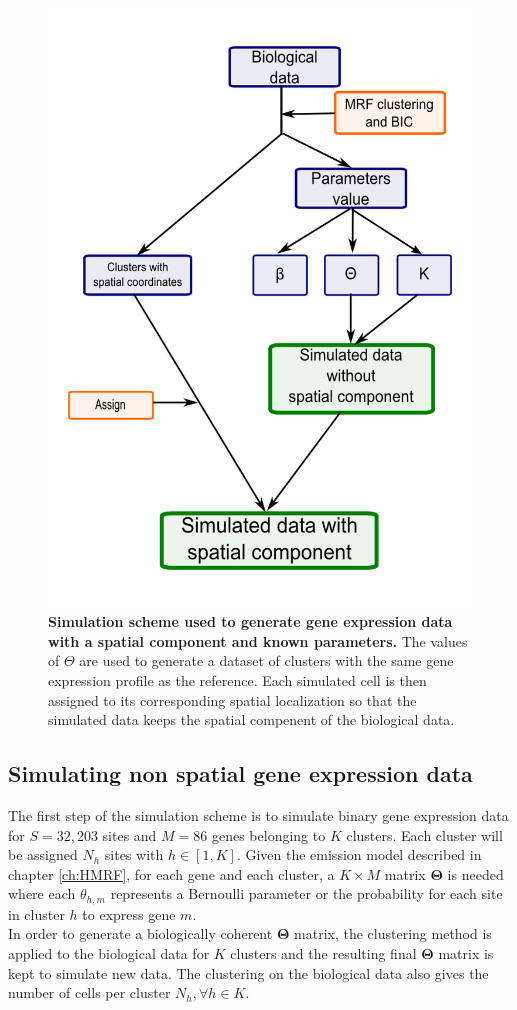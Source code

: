 	\begin{figure}[H]
\centerline{\includegraphics[width=0.6\linewidth]{gfx/chapter5/simulation_scheme.png}}
\caption{{\bf Simulation scheme used to generate gene expression data with a spatial component and known parameters.} The values of $\Theta$ are used to generate a dataset of clusters with the same gene expression profile as the reference. Each simulated cell is then assigned to its corresponding spatial localization so that the simulated data keeps the spatial compenent of the biological data.}
\label{fig:simulationScheme}
	\end{figure}
	
	\subsection{Simulating non spatial gene expression data}\label{subsec:simul_non_spatial}
	The first step of the simulation scheme is to simulate binary gene expression data for $S=32,203$ sites and $M=86$ genes belonging to $K$ clusters. Each cluster will be assigned $N_h$ sites with $h \in [1,K]$. Given the emission model described in chapter \ref{ch:HMRF}, for each gene and each cluster, a $K \times M$ matrix $\boldsymbol{\Theta}$ is needed where each $\theta_{h,m}$ represents a Bernoulli parameter or the probability for each site in cluster $h$ to express gene $m$.\\
	
	In order to generate a biologically coherent $\boldsymbol{\Theta}$ matrix, the clustering method is applied to the biological data for $K$ clusters and the resulting final $\boldsymbol{\Theta}$ matrix is kept to simulate new data. The clustering on the biological data also gives the number of cells per cluster $N_h, \forall h \in K$.\\
	
